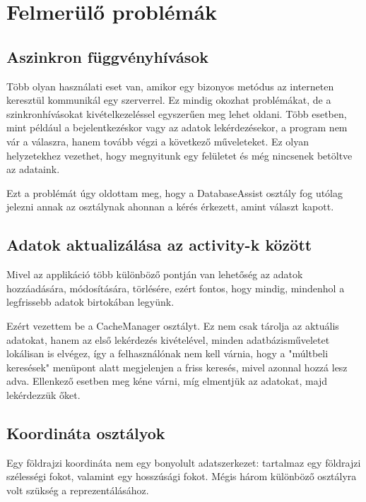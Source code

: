 \section{Felmerülő problémák}\label{sec:ALAP:adatelem}


\subsection{Aszinkron függvényhívások}\label{sec:ALAP:adatelem}

Több olyan használati eset van, amikor egy bizonyos metódus az interneten keresztül kommunikál egy szerverrel. Ez mindig okozhat problémákat, de a szinkronhívásokat kivételkezeléssel egyszerűen meg lehet oldani. Több esetben, mint például a bejelentkezéskor vagy az adatok lekérdezésekor, a program nem vár a válaszra, hanem tovább végzi a következő műveleteket. Ez olyan helyzetekhez vezethet, hogy megnyitunk egy felületet és még nincsenek betöltve az adataink. 

Ezt a problémát úgy oldottam meg, hogy a DatabaseAssist osztály fog utólag jelezni annak az osztálynak ahonnan a kérés érkezett, amint választ kapott.


\subsection{Adatok aktualizálása az activity-k között}\label{sec:ALAP:adatelem}

Mivel az applikáció több különböző pontján van lehetőség az adatok hozzáadására, módosítására, törlésére, ezért fontos, hogy mindig, mindenhol a legfrissebb adatok birtokában legyünk.

Ezért vezettem be a CacheManager osztályt. Ez nem csak tárolja az aktuális adatokat, hanem az első lekérdezés kivételével, minden adatbázisműveletet lokálisan is elvégez, így a felhasználónak nem kell várnia, hogy a "múltbeli keresések" menüpont alatt megjelenjen a friss keresés, mivel azonnal hozzá lesz adva. Ellenkező esetben meg kéne várni, míg elmentjük az adatokat, majd lekérdezzük őket.

\subsection{Koordináta osztályok}

Egy földrajzi koordináta nem egy bonyolult adatszerkezet: tartalmaz egy földrajzi szélességi fokot, valamint egy hosszúsági fokot. Mégis három különböző osztályra volt szükség a reprezentálásához. 


